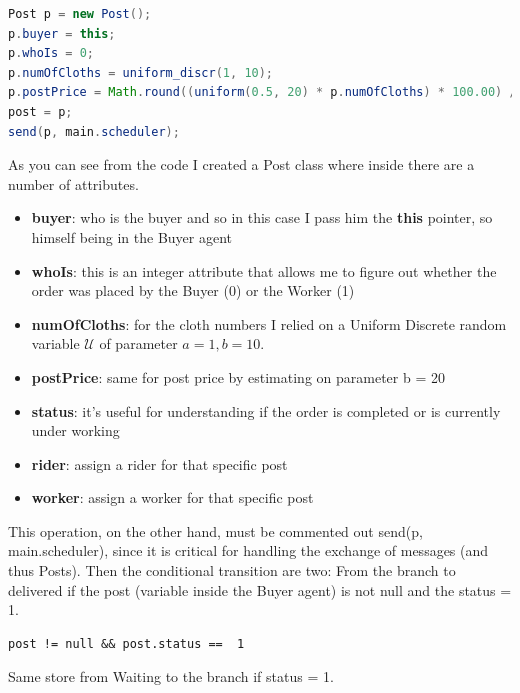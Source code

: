 \begin{lstlisting}[language=Java]
Post p = new Post();
p.buyer = this;
p.whoIs = 0;
p.numOfCloths = uniform_discr(1, 10);
p.postPrice = Math.round((uniform(0.5, 20) * p.numOfCloths) * 100.00) / 100.00;
post = p;
send(p, main.scheduler);
\end{lstlisting}
As you can see from the code I created a Post class where inside there are a number of attributes.
\begin{itemize}
\item \textbf{buyer}: who is the buyer and so in this case I pass him the \textbf{this} pointer, so himself being in the Buyer agent
\item \textbf{whoIs}: this is an integer attribute that allows me to figure out whether the order was placed by the Buyer (0) or the Worker (1)
\item \textbf{numOfCloths}: for the cloth numbers I relied on a Uniform Discrete random variable $\mathcal{U}$ of parameter $a = 1, b = 10$.
\item \textbf{postPrice}: same for post price by estimating on parameter b = 20
\item \textbf{status}: it's useful for understanding if the order is completed or is currently under working
\item \textbf{rider}: assign a rider for that specific post
\item \textbf{worker}: assign a worker for that specific post
\end{itemize}
This operation, on the other hand, must be commented out send(p, main.scheduler), since it is critical for handling the exchange of messages (and thus Posts).
Then the conditional transition are two: From the branch to delivered if the post (variable inside the Buyer agent) is not null and the status = 1.
\begin{lstlisting}
post != null && post.status ==  1
\end{lstlisting}
Same store from Waiting to the branch if status = 1.

